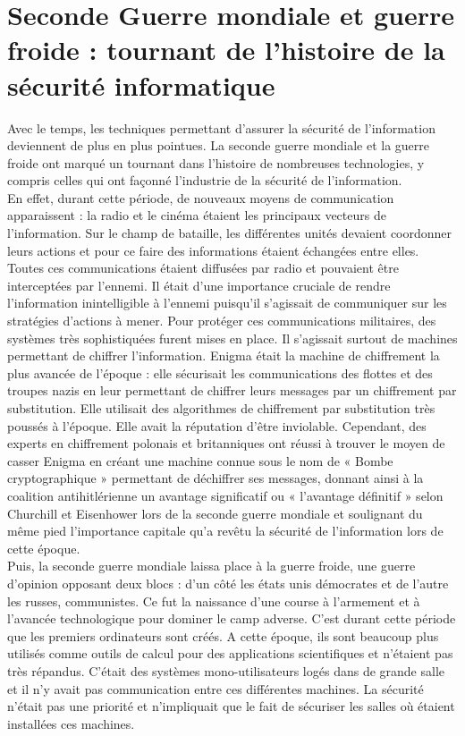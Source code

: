 \section{Seconde Guerre mondiale et guerre froide : tournant de l'histoire de la sécurité informatique}
Avec le temps, les techniques permettant d’assurer la sécurité de l’information deviennent de plus en plus pointues. La seconde guerre mondiale et la guerre froide ont marqué un tournant dans l’histoire de nombreuses technologies, y compris celles qui ont façonné l’industrie de la sécurité de l’information. \\
En effet, durant cette période, de nouveaux moyens de communication apparaissent : la radio et le cinéma étaient les principaux vecteurs de l’information. Sur le champ de bataille, les différentes unités devaient coordonner leurs actions et pour ce faire des informations étaient échangées entre elles. Toutes ces communications étaient diffusées par radio et pouvaient être interceptées par l’ennemi. Il était d’une importance cruciale de rendre l’information inintelligible à l’ennemi puisqu’il s’agissait de communiquer sur les stratégies d’actions à mener. Pour protéger ces communications militaires, des systèmes très sophistiquées furent mises en place. Il s’agissait surtout de machines permettant de chiffrer l’information. Enigma était la machine de chiffrement la plus avancée de l’époque : elle sécurisait  les communications des flottes et des troupes nazis en leur permettant de chiffrer leurs messages par un chiffrement par substitution. Elle utilisait des algorithmes de chiffrement par substitution très poussés à l’époque. Elle avait la réputation d'être inviolable. Cependant, des experts en chiffrement polonais et britanniques ont réussi à trouver le moyen de casser Enigma en créant une machine connue sous le nom de « Bombe cryptographique » permettant de déchiffrer ses messages, donnant ainsi à la coalition antihitlérienne un avantage significatif  ou « l’avantage définitif » selon Churchill et Eisenhower  lors de la seconde guerre mondiale et soulignant du même pied l’importance capitale qu’a revêtu la sécurité de l’information lors de cette époque. \\ 
Puis, la seconde guerre mondiale laissa place à la guerre froide, une guerre d’opinion opposant deux blocs : d’un côté les états unis démocrates et de l’autre les russes, communistes. Ce fut la naissance d’une course à l’armement et à l’avancée technologique pour dominer le camp adverse. 
C’est durant cette période que les premiers ordinateurs sont créés. A cette époque, ils sont beaucoup plus utilisés comme outils de calcul pour des applications scientifiques et n’étaient pas très répandus. C’était des systèmes mono-utilisateurs logés dans de grande salle et il n’y avait pas communication entre ces différentes machines. La sécurité n’était pas une priorité et n’impliquait que le fait de sécuriser les salles où étaient installées ces machines. 
